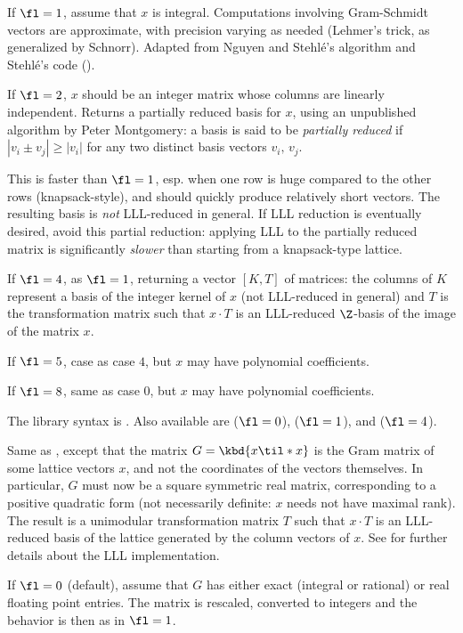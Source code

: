 If $\fl=1$, assume that $x$ is integral. Computations involving Gram-Schmidt
vectors are approximate, with precision varying as needed (Lehmer's trick,
as generalized by Schnorr). Adapted from Nguyen and Stehl\'e's algorithm
and Stehl\'e's code ().

If $\fl=2$, $x$ should be an integer matrix whose columns are linearly
independent. Returns a partially reduced basis for $x$, using an unpublished
algorithm by Peter Montgomery: a basis is said to be \emph{partially reduced}
if $|v_i \pm v_j| \geq |v_i|$ for any two distinct basis vectors $v_i, \,
v_j$.

This is faster than $\fl=1$, esp. when one row is huge compared
to the other rows (knapsack-style), and should quickly produce relatively
short vectors. The resulting basis is \emph{not} LLL-reduced in general.
If LLL reduction is eventually desired, avoid this partial reduction:
applying LLL to the partially reduced matrix is significantly \emph{slower}
than starting from a knapsack-type lattice.

If $\fl=4$, as $\fl=1$, returning a vector $[K, T]$ of matrices: the
columns of $K$ represent a basis of the integer kernel of $x$
(not LLL-reduced in general) and $T$ is the transformation
matrix such that $x\cdot T$ is an LLL-reduced $\Z$-basis of the image
of the matrix $x$.

If $\fl=5$, case as case $4$, but $x$ may have polynomial coefficients.

If $\fl=8$, same as case $0$, but $x$ may have polynomial coefficients.

The library syntax is .
Also available are  ($\fl=0$),
 ($\fl=1$), and  ($\fl=4$).

\label{se:qflllgram}
Same as , except that the
matrix $G = \kbd{x\til * x}$ is the Gram matrix of some lattice vectors $x$,
and not the coordinates of the vectors themselves. In particular, $G$ must
now be a square symmetric real matrix, corresponding to a positive
quadratic form (not necessarily definite: $x$ needs not have maximal rank).
The result is a unimodular
transformation matrix $T$ such that $x \cdot T$ is an LLL-reduced basis of
the lattice generated by the column vectors of $x$. See  for
further details about the LLL implementation.

If $\fl=0$ (default), assume that $G$ has either exact (integral or
rational) or real floating point entries. The matrix is rescaled, converted
to integers and the behavior is then as in $\fl = 1$.

